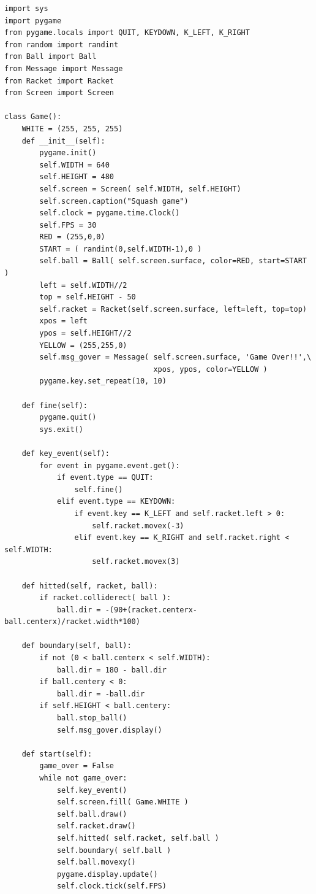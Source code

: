 \documentclass[uplatex,a4paper,11pt,oneside,openany]{jsbook}
\begin{document}
\begin{lstlisting}[caption=Gameクラス（messageオブジェクトを追加）,label=p1]
import sys
import pygame
from pygame.locals import QUIT, KEYDOWN, K_LEFT, K_RIGHT
from random import randint
from Ball import Ball
from Message import Message
from Racket import Racket
from Screen import Screen

class Game():
    WHITE = (255, 255, 255)
    def __init__(self):
        pygame.init()
        self.WIDTH = 640
        self.HEIGHT = 480
        self.screen = Screen( self.WIDTH, self.HEIGHT)
        self.screen.caption("Squash game")
        self.clock = pygame.time.Clock()
        self.FPS = 30
        RED = (255,0,0)
        START = ( randint(0,self.WIDTH-1),0 )
        self.ball = Ball( self.screen.surface, color=RED, start=START )
        left = self.WIDTH//2
        top = self.HEIGHT - 50
        self.racket = Racket(self.screen.surface, left=left, top=top)
        xpos = left
        ypos = self.HEIGHT//2
        YELLOW = (255,255,0)
        self.msg_gover = Message( self.screen.surface, 'Game Over!!',\
                                  xpos, ypos, color=YELLOW )
        pygame.key.set_repeat(10, 10)

    def fine(self):
        pygame.quit()
        sys.exit()

    def key_event(self):
        for event in pygame.event.get():
            if event.type == QUIT:
                self.fine()
            elif event.type == KEYDOWN:
                if event.key == K_LEFT and self.racket.left > 0:
                    self.racket.movex(-3)
                elif event.key == K_RIGHT and self.racket.right < self.WIDTH:
                    self.racket.movex(3)

    def hitted(self, racket, ball):
        if racket.colliderect( ball ):
            ball.dir = -(90+(racket.centerx-ball.centerx)/racket.width*100)

    def boundary(self, ball):
        if not (0 < ball.centerx < self.WIDTH):
            ball.dir = 180 - ball.dir
        if ball.centery < 0:
            ball.dir = -ball.dir
        if self.HEIGHT < ball.centery:
            ball.stop_ball()
            self.msg_gover.display()

    def start(self):
        game_over = False
        while not game_over:
            self.key_event()
            self.screen.fill( Game.WHITE )
            self.ball.draw()
            self.racket.draw()
            self.hitted( self.racket, self.ball )
            self.boundary( self.ball )
            self.ball.movexy()
            pygame.display.update()
            self.clock.tick(self.FPS)
\end{lstlisting}
\end{document}
